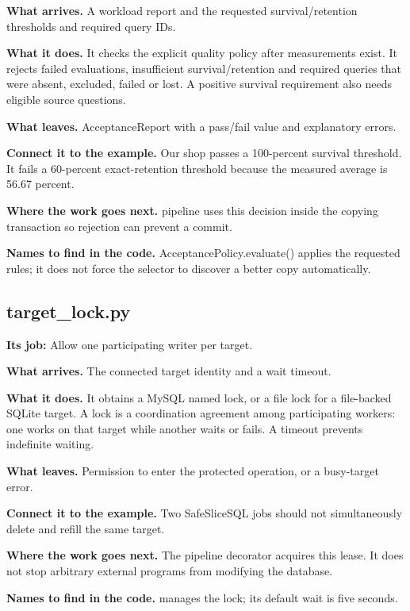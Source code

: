 \textbf{What arrives.} A workload report and the requested survival/retention thresholds and required query IDs.

\textbf{What it does.} It checks the explicit quality policy after measurements exist. It rejects failed evaluations, insufficient survival/retention and required queries that were absent, excluded, failed or lost. A positive survival requirement also needs eligible source questions.

\textbf{What leaves.} AcceptanceReport with a pass/fail value and explanatory errors.

\textbf{Connect it to the example.} Our shop passes a 100-percent survival threshold. It fails a 60-percent exact-retention threshold because the measured average is 56.67 percent.

\textbf{Where the work goes next.} pipeline uses this decision inside the copying transaction so rejection can prevent a commit.

\textbf{Names to find in the code.} AcceptancePolicy.evaluate() applies the requested rules; it does not force the selector to discover a better copy automatically.


\subsection{target\_lock.py}

\textbf{Its job:} Allow one participating writer per target.

\textbf{What arrives.} The connected target identity and a wait timeout.

\textbf{What it does.} It obtains a MySQL named lock, or a file lock for a file-backed SQLite target. A lock is a coordination agreement among participating workers: one works on that target while another waits or fails. A timeout prevents indefinite waiting.

\textbf{What leaves.} Permission to enter the protected operation, or a busy-target error.

\textbf{Connect it to the example.} Two SafeSliceSQL jobs should not simultaneously delete and refill the same  target.

\textbf{Where the work goes next.} The pipeline decorator acquires this lease. It does not stop arbitrary external programs from modifying the database.

\textbf{Names to find in the code.}  manages the lock; its default wait is five seconds.

